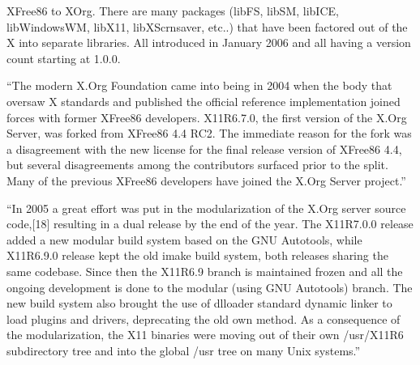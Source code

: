 \documentclass[smallextended,final]{svjour3}
\begin{document}
XFree86 to XOrg. There are many packages (libFS, libSM, libICE, libWindowsWM, libX11, libXScrnsaver, etc..) that have been factored out of the X into separate libraries. All introduced in January 2006 and all having a version count starting at 1.0.0.

“The modern X.Org Foundation came into being in 2004 when the body that oversaw X standards and published the official reference implementation joined forces with former XFree86 developers. X11R6.7.0, the first version of the X.Org Server, was forked from XFree86 4.4 RC2. The immediate reason for the fork was a disagreement with the new license for the final release version of XFree86 4.4, but several disagreements among the contributors surfaced prior to the split. Many of the previous XFree86 developers have joined the X.Org Server project.”

“In 2005 a great effort was put in the modularization of the X.Org server source code,[18] resulting in a dual release by the end of the year. The X11R7.0.0 release added a new modular build system based on the GNU Autotools, while X11R6.9.0 release kept the old imake build system, both releases sharing the same codebase. Since then the X11R6.9 branch is maintained frozen and all the ongoing development is done to the modular (using GNU Autotools) branch. The new build system also brought the use of dlloader standard dynamic linker to load plugins and drivers, deprecating the old own method. As a consequence of the modularization, the X11 binaries were moving out of their own /usr/X11R6 subdirectory tree and into the global /usr tree on many Unix systems.”



\end{document}
